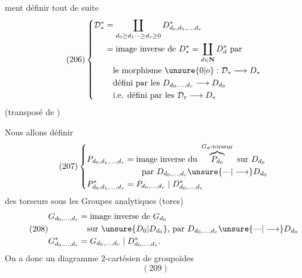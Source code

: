 ment définir tout de suite
\[
\tag{206}
\left\{\begin{aligned}
\mathcal D_*^*&=\coprod_{d_0\geq d_1\cdots\geq d_r\geq0}D^*_{d_0,d_1,\ldots,d_r}\\
&=\text{image inverse de }D_*^*=\coprod_{d\in\mathbf N}D_d^*\text{ par}\\
&\quad\text{le morphisme }\unsure{0|o}:\mathcal D_*\longrightarrow D_*\\
&\quad\text{défini par les }D_{d_0,\ldots,d_r}\longrightarrow D_{d_0}\\
&\quad\text{i.e. défini par les }\mathcal D_r\longrightarrow D_*
\end{aligned}\right.
\]
(transposé de
)

Nous allons définir
\[
\tag{207}
\left\{\begin{aligned}
P_{d_0,d_1,\ldots,d_r}&=\text{image inverse du }\overbrace{P_{d_0}}^{G_d\text{-torseur}}\text{ sur }D_{d_0}\\
&\qquad\text{par }D_{d_0,\ldots,d_r}\unsure{\text{---}|\longrightarrow}D_{d_0}\\
P^*_{d_0,d_1,\ldots,d_r}&=P_{d_0,\ldots,d_r}\mid D^*_{d_0,\ldots,d_r}
\end{aligned}\right.
\]
 des torseurs sous les Groupes analytiques
(tores)
\[
\tag{208}
\begin{aligned}
G_{d_0,\ldots,d_r}&=\text{image inverse de }G_{d_0}\\
&\quad\text{sur }\unsure{D_0|D_{d_0}}\text{, par }D_{d_0,\ldots,d_r}\unsure{\text{---}|\longrightarrow}D_{d_0}\\
G^*_{d_0,\ldots,d_r}&=G_{d_0,\ldots,d_r}\mid D^*_{d_0,\ldots,d_r}.
\end{aligned}
\]
On a donc un diagramme $2$-cartésien de groupoïdes
\[
(209)
\]
